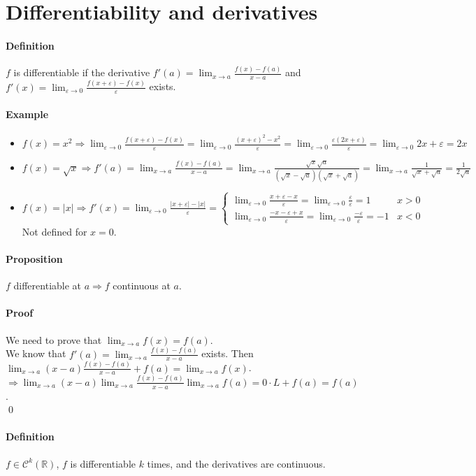 \documentclass{article}
\newcommand{\DS}{\displaystyle}
\newcommand{\lime}{\lim_{\varepsilon \to 0}}
\newcommand{\limx}[1]{\lim_{x \to #1}}
\newcommand{\R}{\mathbb{R}}
\newcommand{\Ep}{\varepsilon}
\newcommand{\Def}{\paragraph{Definition}}
\newcommand{\Proposition}{\paragraph{Proposition}}
\newcommand{\Proof}{\paragraph{Proof}}
\newcommand{\Example}{\paragraph{Example}}
\begin{document}
\section{Differentiability and derivatives}

	\Def $f$ is differentiable if the derivative $\DS f'(a) = \limx{a}
	\frac{f(x)-f(a)}{x-a}$ and $\DS f'(x) = \lime \frac{f(x+\Ep)-f(x)}{\Ep}$
	exists.

	\Example
	\begin{itemize}
		\item $\DS f(x) = x^2 \Rightarrow \lime \frac{f(x+\Ep)-f(x)}{\Ep} =
		\lime \frac{(x+\Ep)^2 - x^2}{\Ep} = \lime \frac{\Ep (2x + \Ep)}{\Ep} =
		\lime 2x + \Ep = 2x$

		\item $\DS f(x) = \sqrt{x} \Rightarrow f'(a) =
		\limx{a} \frac{f(x)-f(a)}{x-a} =
		\limx{a} \frac{\sqrt{x} \sqrt{a}}{(\sqrt{x}-\sqrt{a})(\sqrt{x}+\sqrt{a})} =
		\limx{a} \frac{1}{\sqrt{x}+\sqrt{a}} = \frac{1}{2\sqrt{a}}$

		\item $\DS f(x) = |x| \Rightarrow f'(x) = \lime \frac{|x+\Ep| - |x|}{\Ep} =
		\begin{cases}
			\lime \frac{x + \Ep - x}{\Ep} = \lime \frac{\Ep}{\Ep} = 1 & x > 0 \\
			\lime \frac{-x - \Ep + x}{\Ep} = \lime \frac{-\Ep}{\Ep} = -1 & x < 0
		\end{cases}$
	\\Not defined for $x = 0$.
	\end{itemize}

	\Proposition $f$ differentiable at $a \Rightarrow f$ continuous at $a$.

	\Proof We need to prove that $\DS \limx{a} f(x) = f(a)$.
\\We know that $f'(a) = \limx{a} \frac{f(x)-f(a)}{x-a}$ exists. Then
	$\DS \limx{a} (x-a) \frac{f(x)-f(a)}{x-a} + f(a) = \limx{a} f(x)$.
\\$\DS \Rightarrow \limx{a}(x-a) \limx{a} \frac{f(x)-f(a)}{x-a} \limx{a}f(a) =
	0 \cdot L + f(a) = f(a)$.
\\\qed

	\Def $f \in \mathcal{C}^k(\R)$, $f$ is differentiable $k$ times, and the
	derivatives are continuous.
\end{document}
